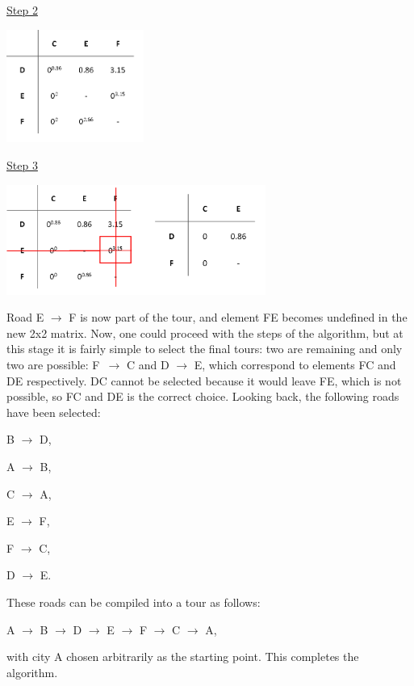 \underline{Step 2} 
\vspace{-3mm}
\begin{center}
	\includegraphics[height=3.7cm]{4pen}
\end{center}	


\underline{Step 3}
\vspace{-2mm}
\begin{center}
	\includegraphics[height=3.6cm]{4elim5}
\end{center}

\noindent
Road E $\rightarrow$ F is now part of the tour, and element FE becomes undefined in the new 2x2 matrix. Now, one could proceed with the steps of the algorithm, but at this stage it is fairly simple to select the final tours: two are remaining and only two are possible: F~$\rightarrow$ C and D $\rightarrow$ E, which correspond to elements FC and DE respectively. DC cannot be selected because it would leave FE, which is not possible, so FC and DE is the correct choice.
Looking back, the following roads have been selected:
\begin{center}
	\par B $\rightarrow$ D, 
	\par A $\rightarrow$ B, 
	\par C $\rightarrow$ A, 
	\par E $\rightarrow$ F,
	\par F $\rightarrow$ C, 
	\par D $\rightarrow$ E.
\end{center}

\noindent
These roads can be compiled into a tour as follows:
\begin{center}
	A $\rightarrow$ B $\rightarrow$ D $\rightarrow$ E $\rightarrow$ F $\rightarrow$ C $\rightarrow$ A,
\end{center}
with city A chosen arbitrarily as the starting point. This completes the algorithm. 